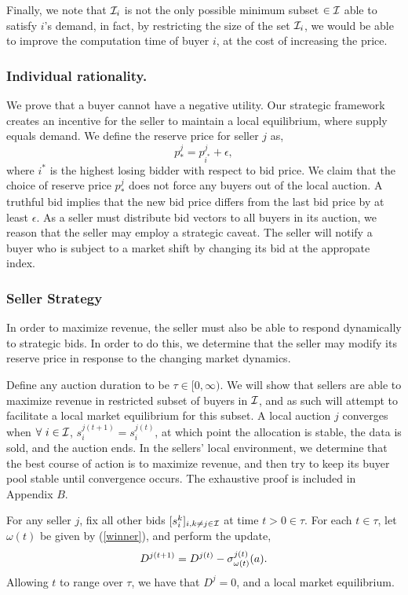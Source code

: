 Finally, we note that $\mathcal{I}_i$ is not the only
possible minimum subset $\in\mathcal{I}$ able to satisfy $i$'s demand, in fact, by
restricting the size of the set $\mathcal{I}_i$, we would be able to improve the
computation time of buyer $i$, at the cost of increasing the price.
 
\subsubsection{Individual rationality.}
We prove that a buyer cannot have a negative utility. Our
strategic framework creates an incentive for the seller to maintain a local
equilibrium, where supply equals demand. 
We define the reserve price for seller $j$ as,
\begin{equation}\label{newprice}
    p_*^{j} = p_{i^*}^{j} + \epsilon,
\end{equation}
where $i^*$ is the highest losing bidder with respect to bid price.
We claim that the choice of reserve price $p_*^j$ does not force any buyers out
of the local auction. 
A truthful bid implies that the new bid price differs from the last bid price by at least
$\epsilon$. As a seller must distribute bid vectors to all
buyers in its auction, we reason that the seller may employ a strategic caveat.
The seller will notify a buyer who is subject to a market shift by changing its
bid at the appropate index.

\subsubsection{Seller Strategy}
In order to
maximize revenue, the seller must also be able to respond dynamically to
strategic bids. In order to do this, we
determine that the seller may modify its reserve price in response to the
changing market dynamics.

Define any auction duration to be $\tau \in [0,\infty)$. 
We will show that sellers are able to maximize revenue in restricted subset of
buyers in $\mathcal{I}$, and as such will attempt to facilitate a local market
equilibrium for this subset. A local auction $j$ converges when $\forall \ i \in\mathcal{I}$,
$s_i^{j(t+1)} = s_i^{j(t)}$, at which point the allocation is stable, the data
is sold, and the auction ends. In the sellers' local environment, we determine
that the best course of action is to maximize revenue, and then try to keep its
buyer pool stable until convergence occurs. The exhaustive proof is included in
Appendix $B$.

{
\label{sellerstrategy}
For any seller $j$, fix all other bids $[s_i^k]_{i,k\ne j \in\mathcal{I}}$ at time $t>0\in\tau$.
For each $t\in\tau$, let $\omega(t)$ be given by (\ref{winner}), and perform
the update,
\begin{equation}\label{newdata}
    D^{j(t+1)} = D^{j(t)} - \sigma_{\omega(t)}^{j(t)}(a).
\end{equation}
Allowing $t$ to range over $\tau$, we have that $D^j=0$, and a local market equilibrium. 
}

